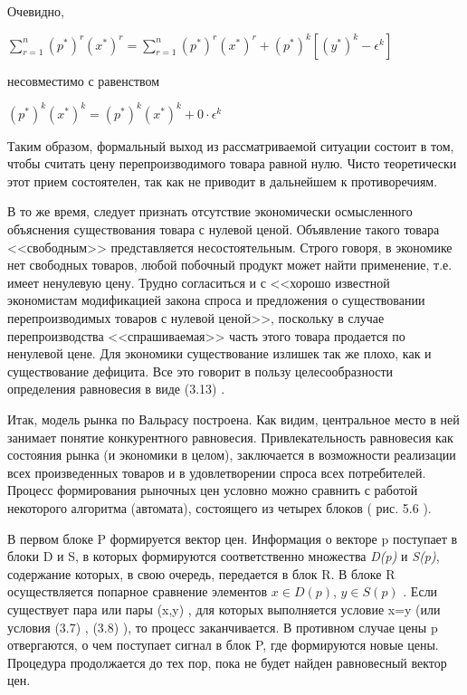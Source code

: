 \documentclass[12pt, 4paper]{book}
\begin{document}
{Очевидно,
\begin{center}
$\sum\limits_{r=1}^{n}(p^{*})^r(x^{*})^r = \sum\limits_{r=1}^{n}(p^{*})^r(x^{*})^r+(p^{*})^k[(y^{*})^k-\epsilon^k]$
\end{center}
\par

несовместимо с равенством
\begin{center}
$(p^{*})^k(x^{*})^k = (p^{*})^k (x^{*})^k + 0 \cdot \epsilon^k$
\end{center}
\par

Таким образом, формальный выход из рассматриваемой ситуации состоит в том, чтобы считать цену перепроизводимого товара равной нулю. Чисто теоретически этот прием состоятелен, так как не приводит в дальнейшем к противоречиям.
\par

В то же время, следует признать отсутствие экономически осмысленного объяснения существования товара с нулевой ценой. Объявление такого товара <<свободным>> представляется несостоятельным. Строго говоря, в экономике нет свободных товаров, любой побочный продукт может найти применение, т.е. имеет ненулевую цену. Трудно согласиться и с <<хорошо известной экономистам модификацией закона спроса и предложения о существовании перепроизводимых товаров с нулевой ценой>>, поскольку в случае перепроизводства <<спрашиваемая>> часть этого товара продается по ненулевой цене. Для экономики существование излишек так же плохо, как и существование дефицита. Все это говорит в пользу целесообразности определения равновесия в виде (3.13) .
\par

Итак, модель рынка по Вальрасу построена. Как видим, центральное место в ней занимает понятие конкурентного равновесия. Привлекательность равновесия как состояния рынка (и экономики в целом), заключается в возможности реализации всех произведенных товаров и в удовлетворении спроса всех потребителей.  Процесс формирования рыночных цен условно можно сравнить с работой некоторого алгоритма (автомата), состоящего из четырех блоков ( рис. 5.6 ). 
\par

В первом блоке P формируется вектор цен. Информация о векторе p поступает в блоки D и S, в которых формируются соответственно множества \textit{D(p)} и \textit{S(p)}, содержание которых, в свою очередь, передается в блок R. В блоке R осуществляется попарное сравнение элементов $x \in D(p)$, $y \in S(p)$ . Если существует пара или пары (x,y) , для которых выполняется условие x=y (или условия (3.7) , (3.8) ), то процесс заканчивается. В противном случае цены p отвергаются, о чем поступает сигнал в блок P, где формируются новые цены. Процедура продолжается до тех пор, пока не будет найден равновесный вектор цен.
\par

}
\end{document}
